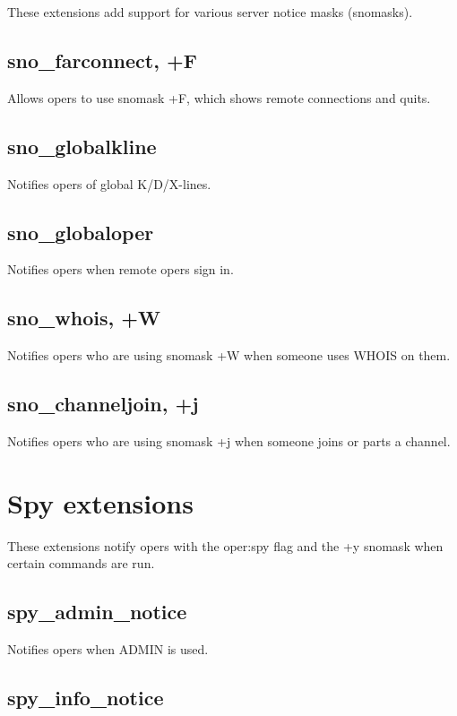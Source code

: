 	These extensions add support for various server notice masks (snomasks).

\subsection{sno\_farconnect, +F}

	Allows opers to use snomask +F, which shows remote connections and quits.

\subsection{sno\_globalkline}

	Notifies opers of global K/D/X-lines.

\subsection{sno\_globaloper}

	Notifies opers when remote opers sign in.

\subsection{sno\_whois, +W}

	Notifies opers who are using snomask +W when someone uses WHOIS on them.

\subsection{sno\_channeljoin, +j}

	Notifies opers who are using snomask +j when someone joins or parts a channel.


\section{Spy extensions}

	These extensions notify opers with the oper:spy flag and the +y snomask
	when certain commands are run.

\subsection{spy\_admin\_notice}

	Notifies opers when ADMIN is used.

\subsection{spy\_info\_notice}


